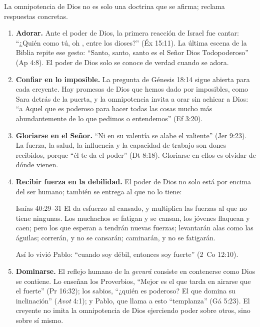 La omnipotencia de Dios no es solo una doctrina que se afirma; reclama respuestas concretas.

\begin{enumerate}
\item \textbf{Adorar.} Ante el poder de Dios, la primera reacción de Israel fue cantar: ``¿Quién como tú, oh \SENOR, entre los dioses?'' (Éx 15:11). La última escena de la Biblia repite ese gesto: ``Santo, santo, santo es el Señor Dios Todopoderoso'' (Ap 4:8). El poder de Dios solo se conoce de verdad cuando se adora.

\item \textbf{Confiar en lo imposible.} La pregunta de Génesis 18:14 sigue abierta para cada creyente. Hay promesas de Dios que hemos dado por imposibles, como Sara detrás de la puerta, y la omnipotencia invita a orar sin achicar a Dios: ``a Aquel que es poderoso para hacer todas las cosas mucho más abundantemente de lo que pedimos o entendemos'' (Ef 3:20).

\item \textbf{Gloriarse en el Señor.} ``Ni en su valentía se alabe el valiente'' (Jer 9:23). La fuerza, la salud, la influencia y la capacidad de trabajo son dones recibidos, porque ``él te da el poder'' (Dt 8:18). Gloriarse en ellos es olvidar de dónde vienen.

\item \textbf{Recibir fuerza en la debilidad.} El poder de Dios no solo está por encima del ser humano; también se entrega al que no lo tiene:

\begin{verso}{Isaías 40:29–31}
El da esfuerzo al cansado, y multiplica las fuerzas al que no tiene ningunas. Los muchachos se fatigan y se cansan, los jóvenes flaquean y caen; pero los que esperan a \SENOR{} tendrán nuevas fuerzas; levantarán alas como las águilas; correrán, y no se cansarán; caminarán, y no se fatigarán.
\end{verso}

Así lo vivió Pablo: ``cuando soy débil, entonces soy fuerte'' (2~Co 12:10).

\item \textbf{Dominarse.} El reflejo humano de la \emph{gevurá} consiste en contenerse como Dios se contiene. Lo enseñan los Proverbios, ``Mejor es el que tarda en airarse que el fuerte'' (Pr 16:32); los sabios, ``¿quién es poderoso? El que domina su inclinación'' (\emph{Avot} 4:1); y Pablo, que llama a esto ``templanza'' (Gá 5:23). El creyente no imita la omnipotencia de Dios ejerciendo poder sobre otros, sino sobre sí mismo.
\end{enumerate}

